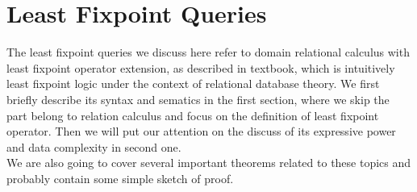 \newpage
\section{Least Fixpoint Queries}
The least fixpoint queries we discuss here refer to domain relational calculus with least fixpoint operator extension, as described in textbook\cite{Abiteboul1}, which is intuitively least fixpoint logic under the context of relational database theory. We first briefly describe its syntax and sematics in the first section, where we skip the part belong to relation calculus and focus on the definition of least fixpoint operator. Then we will put our attention on the discuss of its expressive power and data complexity in second one. \\
We are also going to cover several important theorems related to these topics and probably contain some simple sketch of proof.

